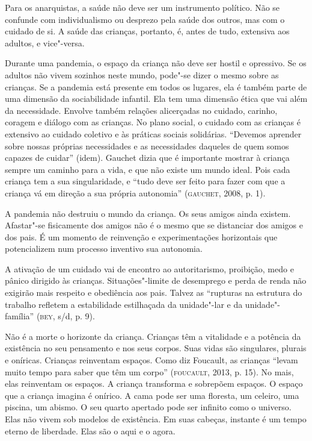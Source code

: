 Para os anarquistas, a saúde não deve ser um instrumento político. Não
se confunde com individualismo ou desprezo pela saúde dos outros, mas
com o cuidado de si. A saúde das crianças, portanto, é, antes de tudo,
extensiva aos adultos, e vice"-versa.

Durante uma pandemia, o espaço da criança não deve ser hostil e
opressivo. Se os adultos não vivem sozinhos neste mundo, pode"-se dizer o
mesmo sobre as crianças. Se a pandemia está presente em todos os
lugares, ela é também parte de uma dimensão da sociabilidade infantil.
Ela tem uma dimensão ética que vai além da necessidade. Envolve também
relações alicerçadas no cuidado, carinho, coragem e diálogo com as
crianças. No plano social, o cuidado com as crianças é extensivo ao
cuidado coletivo e às práticas sociais solidárias. ``Devemos aprender
sobre nossas próprias necessidades e as necessidades daqueles de quem
somos capazes de cuidar'' (idem). Gauchet dizia que é importante mostrar
à criança sempre um caminho para a vida, e que não existe um mundo
ideal. Pois cada criança tem a sua singularidade, e ``tudo deve ser
feito para fazer com que a criança vá em direção a sua própria
autonomia'' (\textsc{gauchet}, 2008, p. 1).

A pandemia não destruiu o mundo da criança. Os seus amigos ainda
existem. Afastar"-se fisicamente dos amigos não é o mesmo que se
distanciar dos amigos e dos pais. É um momento de reinvenção e
experimentações horizontais que potencializem num processo inventivo sua
autonomia.

A ativação de um cuidado vai de encontro ao autoritarismo, proibição,
medo e pânico dirigido às crianças. Situações"-limite de desemprego e
perda de renda não exigirão mais respeito e obediência aos pais. Talvez
as ``rupturas na estrutura do trabalho refletem a estabilidade
estilhaçada da unidade"-lar e da unidade"-família'' (\textsc{bey}, s/d, p. 9).

Não é a morte o horizonte da criança. Crianças têm a vitalidade e a
potência da existência no seu pensamento e nos seus corpos. Suas vidas
são singulares, plurais e oníricas. Crianças reinventam espaços. Como
diz Foucault, as crianças ``levam muito tempo para saber que têm um
corpo'' (\textsc{foucault}, 2013, p. 15). No mais, elas reinventam os espaços. A
criança transforma e sobrepõem espaços. O espaço que a criança imagina é
onírico. A cama pode ser uma floresta, um celeiro, uma piscina, um
abismo. O seu quarto apertado pode ser infinito como o universo. Elas
não vivem sob modelos de existência. Em suas cabeças, instante é um
tempo eterno de liberdade. Elas são o aqui e o agora.

